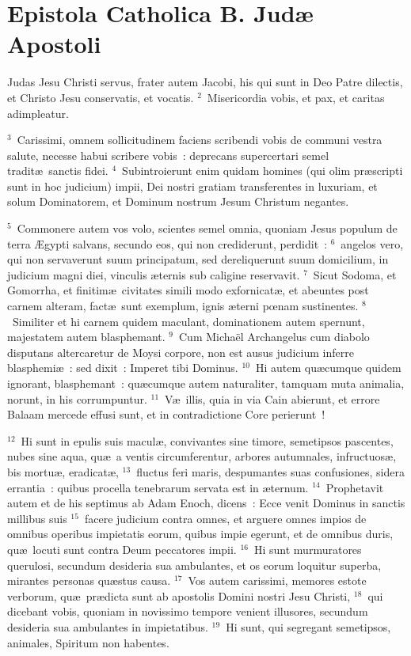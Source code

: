 \clearpage
{\centering \section*{Epistola Catholica B. Judæ Apostoli}}\thispagestyle{empty}

\noindent Judas Jesu Christi servus, frater autem Jacobi, his qui sunt in Deo Patre dilectis, et Christo Jesu conservatis, et vocatis.
${}^{2}$~Misericordia vobis, et pax, et caritas adimpleatur.


${}^{3}$~Carissimi, omnem sollicitudinem faciens scribendi vobis de communi vestra salute, necesse habui scribere vobis~: deprecans supercertari semel tradit\ae\ sanctis fidei.
${}^{4}$~Subintroierunt enim quidam homines (qui olim pr\ae scripti sunt in hoc judicium) impii, Dei nostri gratiam transferentes in luxuriam, et solum Dominatorem, et Dominum nostrum Jesum Christum negantes.


${}^{5}$~Commonere autem vos volo, scientes semel omnia, quoniam Jesus populum de terra \AE gypti salvans, secundo eos, qui non crediderunt, perdidit~:
${}^{6}$~angelos vero, qui non servaverunt suum principatum, sed dereliquerunt suum domicilium, in judicium magni diei, vinculis \ae ternis sub caligine reservavit.
${}^{7}$~Sicut Sodoma, et Gomorrha, et finitim\ae\ civitates simili modo exfornicat\ae , et abeuntes post carnem alteram, fact\ae\ sunt exemplum, ignis \ae terni pœnam sustinentes.
${}^{8}$~Similiter et hi carnem quidem maculant, dominationem autem spernunt, majestatem autem blasphemant.
${}^{9}$~Cum Micha\"el Archangelus cum diabolo disputans altercaretur de Moysi corpore, non est ausus judicium inferre blasphemi\ae~: sed dixit~: Imperet tibi Dominus.
${}^{10}$~Hi autem qu\ae cumque quidem ignorant, blasphemant~: qu\ae cumque autem naturaliter, tamquam muta animalia, norunt, in his corrumpuntur.
${}^{11}$~V\ae\ illis, quia in via Cain abierunt, et errore Balaam mercede effusi sunt, et in contradictione Core perierunt~!


${}^{12}$~Hi sunt in epulis suis macul\ae , convivantes sine timore, semetipsos pascentes, nubes sine aqua, qu\ae\ a ventis circumferentur, arbores autumnales, infructuos\ae , bis mortu\ae , eradicat\ae ,
${}^{13}$~fluctus feri maris, despumantes suas confusiones, sidera errantia~: quibus procella tenebrarum servata est in \ae ternum.
${}^{14}$~Prophetavit autem et de his septimus ab Adam Enoch, dicens~: Ecce venit Dominus in sanctis millibus suis
${}^{15}$~facere judicium contra omnes, et arguere omnes impios de omnibus operibus impietatis eorum, quibus impie egerunt, et de omnibus duris, qu\ae\ locuti sunt contra Deum peccatores impii.
${}^{16}$~Hi sunt murmuratores querulosi, secundum desideria sua ambulantes, et os eorum loquitur superba, mirantes personas qu\ae stus causa.
${}^{17}$~Vos autem carissimi, memores estote verborum, qu\ae\ pr\ae dicta sunt ab apostolis Domini nostri Jesu Christi,
${}^{18}$~qui dicebant vobis, quoniam in novissimo tempore venient illusores, secundum desideria sua ambulantes in impietatibus.
${}^{19}$~Hi sunt, qui segregant semetipsos, animales, Spiritum non habentes.


